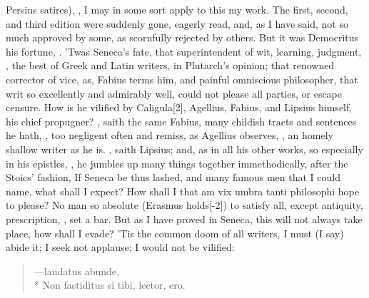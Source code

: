 {Persius satires), , I may in some sort apply to this my work. The
first, second, and third edition were suddenly gone, eagerly read, and,
as I have said, not so much approved by some, as scornfully rejected by
others. But it was Democritus his fortune, . 'Twas Seneca's fate, that superintendent of
wit, learning, judgment, , the best of Greek and
Latin writers, in Plutarch's opinion; that renowned corrector of vice,
as, Fabius terms him, and painful omniscious philosopher, that
writ so excellently and admirably well, could not please all parties,
or escape censure. How is he vilified by Caligula[2\baselineskip], Agellius,
Fabius, and Lipsius himself, his chief propugner? , saith the same Fabius, many childish tracts and sentences
he hath, , too negligent often and remiss, as Agellius
observes, , an homely shallow writer as he is. , saith Lipsius; and, as in all his other works,
so especially in his epistles, , he jumbles up many things together immethodically, after the
Stoics' fashion,  If Seneca be
thus lashed, and many famous men that I could name, what shall I
expect? How shall I that am vix umbra tanti philosophi hope to please?
No man so absolute (Erasmus holds[-2\baselineskip]) to satisfy all, except
antiquity, prescription, \etc, set a bar. But as I have proved in
Seneca, this will not always take place, how shall I evade? 'Tis the
common doom of all writers, I must (I say) abide it; I seek not
applause;  I would not be vilified:

\begin{verse}
\textlatin{---laudatus abunde},\\*
\textlatin{Non fastiditus si tibi, lector, ero.}
\end{verse}

}
